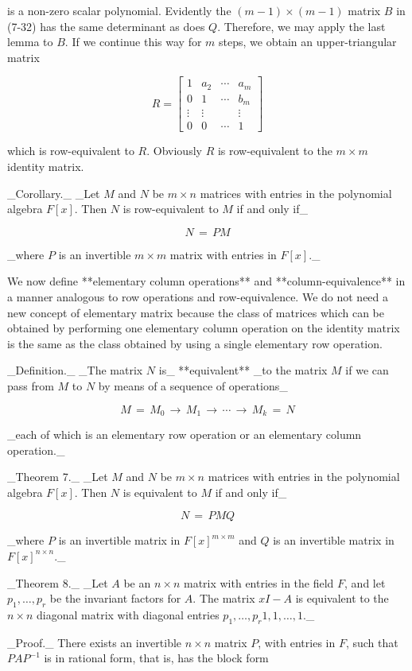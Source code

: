 is a non-zero scalar polynomial. Evidently the \((m-1)\times(m-1)\) matrix \(B\) in (7-32) has the same determinant as does \(Q\). Therefore, we may apply the last lemma to \(B\). If we continue this way for \(m\) steps, we obtain an upper-triangular matrix

\[R=\begin{bmatrix}1&a_{2}&\cdots&a_{m}\\ 0&1&\cdots&b_{m}\\ \vdots&\vdots&&\vdots\\ 0&0&\cdots&1\end{bmatrix}\]

which is row-equivalent to \(R\). Obviously \(R\) is row-equivalent to the \(m\times m\) identity matrix.

_Corollary._ _Let \(M\) and \(N\) be \(m\times n\) matrices with entries in the polynomial algebra \(F[x]\). Then \(N\) is row-equivalent to \(M\) if and only if_

\[N\,=\,PM\]

_where \(P\) is an invertible \(m\times m\) matrix with entries in \(F[x]\)._

We now define **elementary column operations** and **column-equivalence** in a manner analogous to row operations and row-equivalence. We do not need a new concept of elementary matrix because the class of matrices which can be obtained by performing one elementary column operation on the identity matrix is the same as the class obtained by using a single elementary row operation.

_Definition._ _The matrix \(N\) is_ **equivalent** _to the matrix \(M\) if we can pass from \(M\) to \(N\) by means of a sequence of operations_

\[M\,=\,M_{0}\,\rightarrow\,M_{1}\,\rightarrow\,\cdots\,\rightarrow\,M_{k}\,=\,N\]

_each of which is an elementary row operation or an elementary column operation._

_Theorem 7._ _Let \(M\) and \(N\) be \(m\times n\) matrices with entries in the polynomial algebra \(F[x]\). Then \(N\) is equivalent to \(M\) if and only if_

\[N\,=\,PMQ\]

_where \(P\) is an invertible matrix in \(F[x]^{m\times m}\) and \(Q\) is an invertible matrix in \(F[x]^{n\times n}\)._

_Theorem 8._ _Let \(A\) be an \(n\times n\) matrix with entries in the field \(F\), and let \(p_{1},\ldots,p_{r}\) be the invariant factors for \(A\). The matrix \(xI-A\) is equivalent to the \(n\times n\) diagonal matrix with diagonal entries \(p_{1},\ldots,p_{r}\)\(1,\)\(1,\ldots,\)\(1\)._

_Proof._ There exists an invertible \(n\times n\) matrix \(P\), with entries in \(F\), such that \(PAP^{-1}\) is in rational form, that is, has the block form 